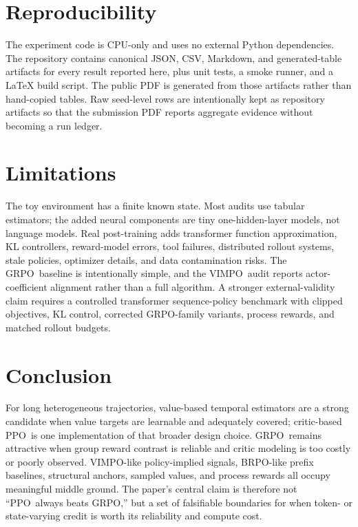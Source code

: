 \documentclass[11pt]{article}
\newcommand{\grpo}{\textsc{GRPO}}
\newcommand{\ppo}{\textsc{PPO}}
\newcommand{\vimpo}{\textsc{VIMPO}}
\newcommand{\brpo}{\textsc{BRPO}}
\begin{document}
\section{Reproducibility}

The experiment code is CPU-only and uses no external Python dependencies. The
repository contains canonical JSON, CSV, Markdown, and generated-table
artifacts for every result reported here, plus unit tests, a smoke runner, and
a LaTeX build script. The public PDF is generated from those artifacts rather
than hand-copied tables. Raw seed-level rows are intentionally kept as
repository artifacts so that the submission PDF reports aggregate evidence
without becoming a run ledger.

\section{Limitations}

The toy environment has a finite known state. Most audits use tabular
estimators; the added neural components are tiny one-hidden-layer models, not
language models. Real post-training adds transformer function approximation, KL
controllers, reward-model errors, tool failures, distributed rollout systems,
stale policies, optimizer details, and data contamination risks. The \grpo\
baseline is intentionally simple, and the \vimpo\ audit reports
actor-coefficient alignment rather than a full algorithm. A stronger
external-validity claim requires a controlled transformer sequence-policy
benchmark with clipped objectives, KL control, corrected \grpo-family variants,
process rewards, and matched rollout budgets.

\section{Conclusion}

For long heterogeneous trajectories, value-based temporal estimators are a
strong candidate when value targets are learnable and adequately covered;
critic-based \ppo\ is one implementation of that broader design choice. \grpo\
remains attractive when group reward contrast is reliable and critic modeling
is too costly or poorly observed. \vimpo-like policy-implied signals,
\brpo-like prefix baselines, structural anchors, sampled values, and process
rewards all occupy meaningful middle ground. The paper's central claim is
therefore not ``\ppo\ always beats \grpo,'' but a set of falsifiable boundaries
for when token- or state-varying credit is worth its reliability and compute
cost.
\end{document}
